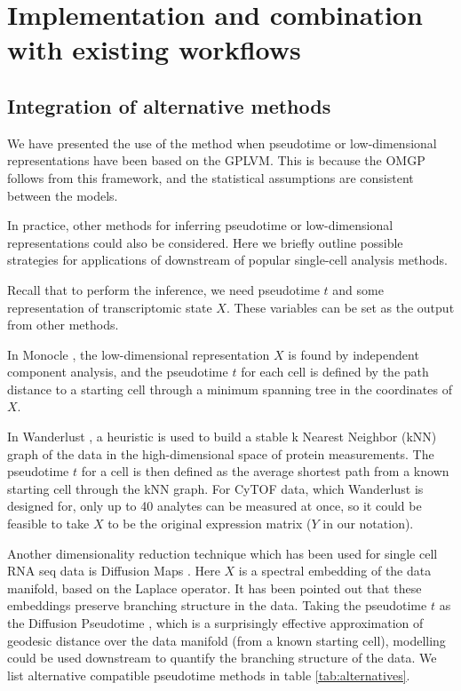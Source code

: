 \section{Implementation and combination with existing workflows} \label{sec:combination}

\subsection{Integration of alternative methods} \label{sec:integration}

We have presented the use of the  method when pseudotime or low-dimensional representations have been based on the GPLVM. This is because the OMGP follows from this framework, and the statistical assumptions are consistent between the models.

In practice, other methods for inferring pseudotime or low-dimensional representations could also be considered. Here we briefly outline possible strategies for applications of  downstream of popular single-cell analysis methods.

Recall that to perform the  inference, we need pseudotime $ t $ and some representation of transcriptomic state $ X $. These variables can be set as the output from other methods.

In Monocle \cite{Trapnell2014-cn}, the low-dimensional representation $ X $ is found by independent component analysis, and the pseudotime $ t $ for each cell is defined by the path distance to a starting cell through a minimum spanning tree in the coordinates of $ X $.

In Wanderlust \cite{Bendall2014-kg}, a heuristic is used to build a stable k Nearest Neighbor (kNN) graph of the data in the high-dimensional space of protein measurements. The pseudotime $ t $ for a cell is then defined as the average shortest path from a known starting cell through the kNN graph. For CyTOF data, which Wanderlust is designed for, only up to 40 analytes can be measured at once, so it could be feasible to take $ X $ to be the original expression matrix ($ Y $ in our notation).

Another dimensionality reduction technique which has been used for single cell RNA seq data is Diffusion Maps \cite{Haghverdi2015-ig}. Here $ X $ is a spectral embedding of the  data manifold, based on the Laplace operator. It has been pointed out that these embeddings preserve branching structure in the data. Taking the pseudotime $ t $ as the Diffusion Pseudotime \cite{Haghverdi2016-tm}, which is a surprisingly effective approximation of geodesic distance over the data manifold (from a known starting cell),  modelling could be used downstream to quantify the branching structure of the data. We list alternative compatible pseudotime methods in table \ref{tab:alternatives}. 

